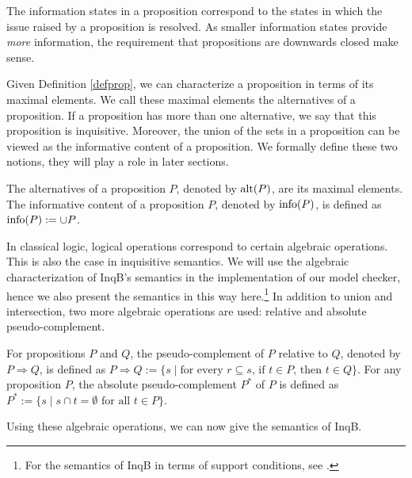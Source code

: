 The information states in a proposition correspond to the states in which the issue raised by a proposition is resolved. As smaller information states provide \emph{more} information, the requirement that propositions are downwards closed make sense.

Given Definition \ref{defprop}, we can characterize a proposition in terms of its maximal elements. We call these maximal elements the alternatives of a proposition. If a proposition has more than one alternative, we say that this proposition is inquisitive. Moreover, the union of the sets in a proposition can be viewed as the informative content of a proposition. We formally define these two notions, they will play a role in later sections.

\begin{defi}
 The alternatives of a proposition $P$, denoted by $\textrm{alt}(P)$, are its maximal elements. The informative content of a proposition $P$, denoted by $\textrm{info}(P)$, is defined as $\textrm{info}(P):=\cup P$.
\end{defi}

In classical logic, logical operations correspond to certain algebraic operations. This is also the case in inquisitive semantics. We will use the algebraic characterization of \textsf{InqB}'s semantics in the implementation of our model checker, hence we also present the semantics in this way here.\footnote{For the semantics of \textsf{InqB} in terms of support conditions, see \cite[p.\ 62-63]{inquisitive19}.} In addition to union and intersection, two more algebraic operations are used: relative and absolute pseudo-complement.

\begin{defi}
 For propositions $P$ and $Q$, the pseudo-complement of $P$ relative to $Q$, denoted by $P\Rightarrow Q$, is defined as $P\Rightarrow Q:= \{s \mid \text{for every } r\subseteq s\text{, if } t\in P\text{, then } t\in Q\}$. For any proposition $P$, the absolute pseudo-complement $P^*$ of $P$ is defined as $P^*:=\{s\mid s\cap t=\emptyset \text{ for all } t\in P\}$.
\end{defi}
Using these algebraic operations, we can now give the semantics of \textsf{InqB}.

